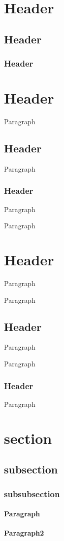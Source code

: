 \section{Header}
\subsection{Header}
\subsubsection{Header}
\hrulefill
\section{Header}
Paragraph

\subsection{Header}
Paragraph

\subsubsection{Header}
Paragraph

\hrulefill
Paragraph

\section{Header}
Paragraph

Paragraph

\subsection{Header}
Paragraph

Paragraph

\subsubsection{Header}
Paragraph

\section{section}
\subsection{subsection}
\subsubsection{subsubsection}
\paragraph{Paragraph}
\paragraph{Paragraph2}
